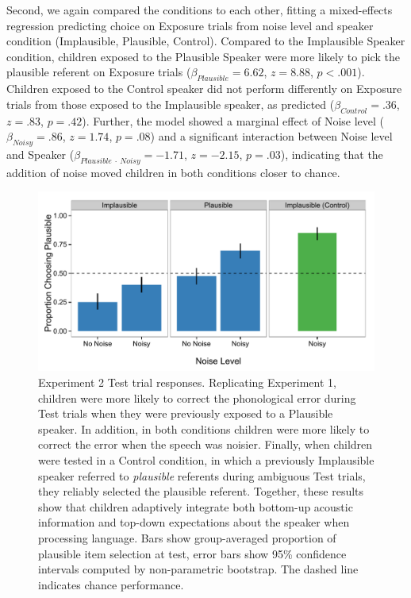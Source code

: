 \documentclass[man,floatsintext]{apa6}
\begin{document}
Second, we again compared the conditions to each other, fitting a mixed-effects regression predicting choice on Exposure trials from noise level and speaker condition (Implausible, Plausible, Control). Compared to the Implausible Speaker condition, children exposed to the Plausible Speaker were more likely to pick the plausible referent on Exposure trials ($\beta_{Plausible} = 6.62$,  $z = 8.88$, $p <.001$). Children exposed to the Control speaker did not perform differently on Exposure trials from those exposed to the Implausible speaker, as predicted ($\beta_{Control} = .36$,  $z = .83$, $p = .42$). Further, the model showed a marginal effect of Noise level ($\beta_{Noisy} = .86$,  $z = 1.74$, $p = .08$) and a significant interaction between Noise level and Speaker ($\beta_{Plausible \: \cdot \: Noisy} = -1.71$, $z= -2.15$, $p = .03$), indicating that the addition of noise moved children in both conditions closer to chance.

\begin{figure}[t]
     \centering
     \includegraphics[width=5in]{figures/exp2_results.pdf}
    \caption{Experiment 2 Test trial responses. Replicating Experiment 1, children were more likely to correct the phonological error during Test trials when they were previously exposed to a Plausible speaker. In addition, in both conditions children were more likely to correct the error when the speech was noisier. Finally, when children were tested in a Control condition, in which a previously Implausible speaker referred to \emph{plausible} referents during ambiguous Test trials, they reliably selected the plausible referent. Together, these results show that children adaptively integrate both bottom-up acoustic information and top-down expectations about the speaker when processing language. Bars show group-averaged proportion of plausible item selection at test, error bars show 95\% confidence intervals computed by non-parametric bootstrap. The dashed line indicates chance performance.}%
   \label{fig:exp2_results}
\end{figure}
\end{document}

